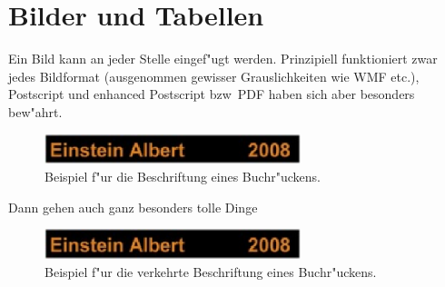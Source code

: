 \chapter{Bilder und Tabellen}

Ein Bild kann an jeder Stelle eingef"ugt werden. Prinzipiell funktioniert zwar jedes Bildformat (ausgenommen gewisser Grauslichkeiten wie WMF etc.), Postscript und enhanced Postscript bzw~PDF haben sich aber besonders bew"ahrt.
\begin{figure}[H]
\centering
\includegraphics[width=75mm]{bilder/Buchruecken}
\caption[Beschriftung eines Buchr"uckens.]{Beispiel f"ur die Beschriftung eines Buchr"uckens.}
\label{fig-buch}
\end{figure}
Dann gehen auch ganz besonders tolle Dinge
\begin{figure}[H]
\centering
\includegraphics[width=75mm,angle=180]{bilder/Buchruecken}
\caption[Verkehrte Beschriftung eines Buchr"uckens.]{Beispiel f"ur die verkehrte Beschriftung eines Buchr"uckens.}
\label{fig-buch_90}
\end{figure}
